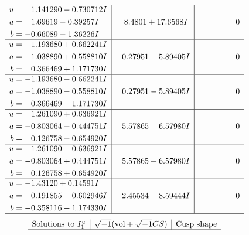 \documentclass[1p]{elsarticle_modified}
\theoremstyle{definition}
\newcommand{\I}{\sqrt{-1}}
\begin{document}
$$\begin{array}{c|c|c}
\begin{aligned}
u &= \phantom{-}1.141290 - 0.730712 I \\
a &= \phantom{-}1.69619 - 0.39257 I \\
b &= -0.66089 - 1.36226 I\end{aligned}
 & \phantom{-}8.4801 + 17.6568 I & \phantom{-0.000000 } 0 \\ \hline\begin{aligned}
u &= -1.193680 + 0.662241 I \\
a &= -1.038890 + 0.558810 I \\
b &= \phantom{-}0.366469 + 1.171730 I\end{aligned}
 & \phantom{-}0.27951 + 5.89405 I & \phantom{-0.000000 } 0 \\ \hline\begin{aligned}
u &= -1.193680 - 0.662241 I \\
a &= -1.038890 - 0.558810 I \\
b &= \phantom{-}0.366469 - 1.171730 I\end{aligned}
 & \phantom{-}0.27951 - 5.89405 I & \phantom{-0.000000 } 0 \\ \hline\begin{aligned}
u &= \phantom{-}1.261090 + 0.636921 I \\
a &= -0.803064 - 0.444751 I \\
b &= \phantom{-}0.126758 - 0.654920 I\end{aligned}
 & \phantom{-}5.57865 - 6.57980 I & \phantom{-0.000000 } 0 \\ \hline\begin{aligned}
u &= \phantom{-}1.261090 - 0.636921 I \\
a &= -0.803064 + 0.444751 I \\
b &= \phantom{-}0.126758 + 0.654920 I\end{aligned}
 & \phantom{-}5.57865 + 6.57980 I & \phantom{-0.000000 } 0 \\ \hline\begin{aligned}
u &= -1.43120 + 0.14591 I \\
a &= \phantom{-}0.191855 - 0.602946 I \\
b &= -0.358116 - 1.174330 I\end{aligned}
 & \phantom{-}2.45534 + 8.59444 I & \phantom{-0.000000 } 0\\
 \hline 
 \end{array}$$\newpage$$\begin{array}{c|c|c}  
\text{Solutions to }I^u_{1}& \I (\text{vol} + \sqrt{-1}CS) & \text{Cusp shape}\\
 \hline 

\end{array}$$
\end{document}
